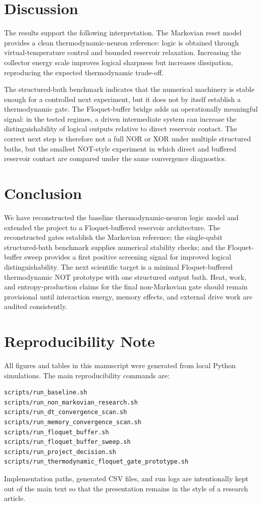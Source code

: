 \documentclass[11pt]{article}
\begin{document}
\section{Discussion}

The results support the following interpretation.  The Markovian reset model provides a
clean thermodynamic-neuron reference: logic is obtained through virtual-temperature control
and bounded reservoir relaxation.  Increasing the collector energy scale improves logical
sharpness but increases dissipation, reproducing the expected thermodynamic trade-off.

The structured-bath benchmark indicates that the numerical machinery is stable enough for a
controlled next experiment, but it does not by itself establish a thermodynamic gate.  The
Floquet-buffer bridge adds an operationally meaningful signal: in the tested regimes, a
driven intermediate system can increase the distinguishability of logical outputs relative
to direct reservoir contact.  The correct next step is therefore not a full NOR or XOR under
multiple structured baths, but the smallest NOT-style experiment in which direct and
buffered reservoir contact are compared under the same convergence diagnostics.

\section{Conclusion}

We have reconstructed the baseline thermodynamic-neuron logic model and extended the
project to a Floquet-buffered reservoir architecture.  The reconstructed gates establish the
Markovian reference; the single-qubit structured-bath benchmark supplies numerical
stability checks; and the Floquet-buffer sweep provides a first positive screening signal
for improved logical distinguishability.  The next scientific target is a minimal
Floquet-buffered thermodynamic NOT prototype with one structured output bath.  Heat, work,
and entropy-production claims for the final non-Markovian gate should remain provisional
until interaction energy, memory effects, and external drive work are audited consistently.

\appendix
\section{Reproducibility Note}

All figures and tables in this manuscript were generated from local Python simulations.  The
main reproducibility commands are:
\begin{verbatim}
scripts/run_baseline.sh
scripts/run_non_markovian_research.sh
scripts/run_dt_convergence_scan.sh
scripts/run_memory_convergence_scan.sh
scripts/run_floquet_buffer.sh
scripts/run_floquet_buffer_sweep.sh
scripts/run_project_decision.sh
scripts/run_thermodynamic_floquet_gate_prototype.sh
\end{verbatim}
Implementation paths, generated CSV files, and run logs are intentionally kept out of the
main text so that the presentation remains in the style of a research article.
\end{document}

